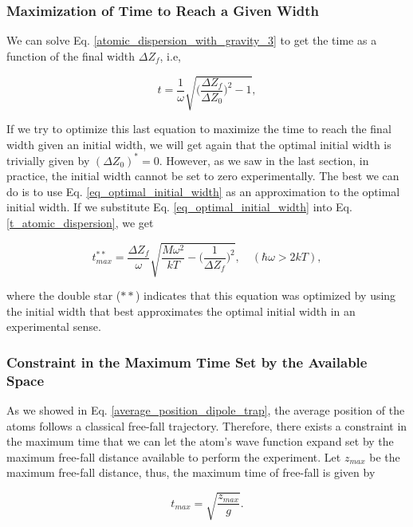\documentclass{article}
\begin{document}
\subsubsection{Maximization of Time to Reach a Given Width}
We can solve Eq. \ref{atomic_dispersion_with_gravity_3} to get the time as a function of the final width $\Delta Z_{f}$, i.e,

\begin{equation}\label{t_atomic_dispersion}
    t = \frac{1}{\omega} \sqrt{\bigg( \frac{\Delta Z_{f}}{\Delta Z_{0}} \bigg)^{2} - 1},
\end{equation}

If we try to optimize this last equation to maximize the time to reach the final width given an initial width, we will get again that the optimal initial width is trivially given by $(\Delta Z_{0})^{*} = 0$. However, as we saw in the last section, in practice, the initial width cannot be set to zero experimentally. The best we can do is to use Eq. \ref{eq_optimal_initial_width} as an approximation to the optimal initial width. If we substitute Eq. \ref{eq_optimal_initial_width} into Eq. \ref{t_atomic_dispersion}, we get

\begin{equation}\label{t_dipole_trap_optimized}
    t^{**}_{max} = \frac{\Delta Z_{f}}{\omega} \sqrt{\frac{M \omega^{2}}{kT} - \bigg(\frac{1}{\Delta Z_{f}}\bigg)^{2}}, \quad (\hbar \omega > 2kT),
\end{equation}

where the double star ($**$) indicates that this equation was optimized by using the initial width that best approximates the optimal initial width in an experimental sense.

\subsubsection{Constraint in the Maximum Time Set by the Available Space}
As we showed in Eq. \ref{average_position_dipole_trap}, the average position of the atoms follows a classical free-fall trajectory. Therefore, there exists a constraint in the maximum time that we can let the atom's wave function expand set by the maximum free-fall distance available to perform the experiment. Let $z_{max}$ be the maximum free-fall distance, thus, the maximum time of free-fall is given by

\begin{equation}
    t_{max} = \sqrt{\frac{z_{max}}{g}}.
\end{equation}
\end{document}

